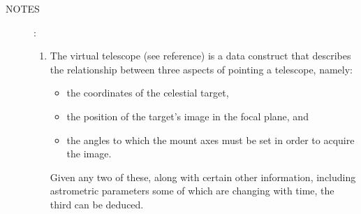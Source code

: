 \documentclass[11pt,fleqn,twoside,\paper]{article}
\renewcommand{\_}{{\tt\char'137}}     %
\newcommand{\notes}[1]
{
  \goodbreak
  \begin{description}
    \item[NOTES]: \nopagebreak
        #1
  \end{description}
  \vspace{-3ex}
}
\begin{document}
\notes{
\begin{enumerate}
\setlength{\parskip}{\medskipamount}
\item The virtual telescope (see reference) is a data construct that
      describes the relationship between three aspects of pointing a
      telescope, namely:
      \begin{itemize}
      \item the coordinates of the celestial target,
      \item the position of the target's image in the focal plane, and
      \item the angles to which the mount axes must be set in order to
            acquire the image.
      \end{itemize}
      Given any two of these, along with certain other information,
      including astrometric parameters some of which are changing
      with time, the third can be deduced.


\end{enumerate}}
\end{document}
